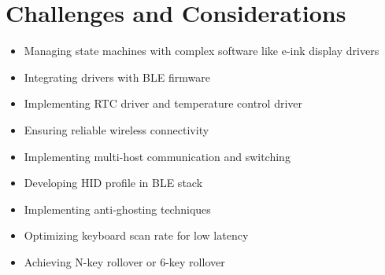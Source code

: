 \documentclass[a4paper,11pt]{article}%
\begin{document}
\section{Challenges and Considerations}
\begin{itemize}
\item Managing state machines with complex software like e-ink display drivers
\item Integrating drivers with BLE firmware
\item Implementing RTC driver and temperature control driver
\item Ensuring reliable wireless connectivity
\item Implementing multi-host communication and switching
\item Developing HID profile in BLE stack
\item Implementing anti-ghosting techniques
\item Optimizing keyboard scan rate for low latency
\item Achieving N-key rollover or 6-key rollover
\end{itemize}



\end{document}
